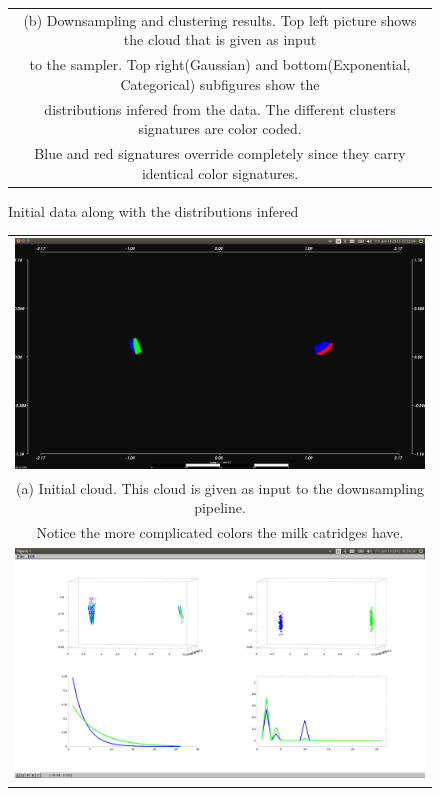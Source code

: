 \documentclass[twoside,hidelinks]{article}
\begin{document}
\begin{figure}
\begin{tabular}{c}
 (b) Downsampling and clustering results. Top left picture shows the cloud that is given as input\\
 to the sampler. Top right(Gaussian) and bottom(Exponential, Categorical) subfigures show the \\
 distributions infered from the data.  The different clusters signatures  are color coded. \\
 Blue and red signatures override completely since they carry identical color signatures.\\
 \end{tabular}
\caption{Initial data along with the distributions infered }
  \label{pcl:clust}
\end{figure}


\begin{figure}
\begin{tabular}{c}
  \includegraphics[width=1\textwidth]{clusterings/coloursSource} \\
  (a) Initial cloud. This cloud is given as input to the downsampling pipeline.    \\
   Notice the more complicated colors the milk catridges have. \\
   \includegraphics[width=1\textwidth]{clusterings/coloursCorrect} \\

\end{tabular}
\end{figure}
\end{document}
